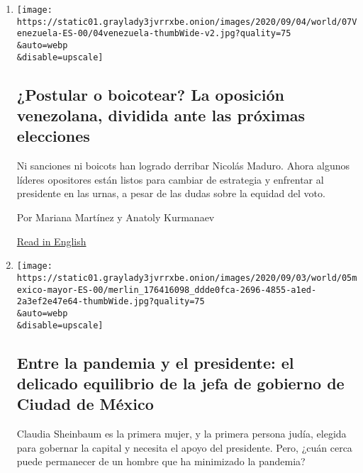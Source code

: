 \begin{enumerate}
\def\labelenumi{\arabic{enumi}.}
\item
  \href{/es/2020/09/07/espanol/america-latina/venezuela-oposicion.html}{}

  \texttt{[image: https://static01.graylady3jvrrxbe.onion/images/2020/09/04/world/07Venezuela-ES-00/04venezuela-thumbWide-v2.jpg?quality=75\\\&auto=webp\\\&disable=upscale]}

  \hypertarget{postular-o-boicotear-la-oposiciuxf3n-venezolana-dividida-ante-las-pruxf3ximas-elecciones}{%
  \subsection{¿Postular o boicotear? La oposición venezolana, dividida
  ante las próximas
  elecciones}\label{postular-o-boicotear-la-oposiciuxf3n-venezolana-dividida-ante-las-pruxf3ximas-elecciones}}

  Ni sanciones ni boicots han logrado derribar Nicolás Maduro. Ahora
  algunos líderes opositores están listos para cambiar de estrategia y
  enfrentar al presidente en las urnas, a pesar de las dudas sobre la
  equidad del voto.

  Por Mariana Martínez y Anatoly Kurmanaev

  \href{https://www.nytimes3xbfgragh.onion/2020/09/06/international-home/venezuela-elections-maduro.html}{Read
  in English}
\item
  \href{/es/2020/09/05/espanol/america-latina/coronavirus-amlo-sheinbaum.html}{}

  \texttt{[image: https://static01.graylady3jvrrxbe.onion/images/2020/09/03/world/05mexico-mayor-ES-00/merlin\_176416098\_ddde0fca-2696-4855-a1ed-2a3ef2e47e64-thumbWide.jpg?quality=75\\\&auto=webp\\\&disable=upscale]}

  \hypertarget{entre-la-pandemia-y-el-presidente-el-delicado-equilibrio-de-la-jefa-de-gobierno-de-ciudad-de-muxe9xico}{%
  \subsection{Entre la pandemia y el presidente: el delicado equilibrio
  de la jefa de gobierno de Ciudad de
  México}\label{entre-la-pandemia-y-el-presidente-el-delicado-equilibrio-de-la-jefa-de-gobierno-de-ciudad-de-muxe9xico}}

  Claudia Sheinbaum es la primera mujer, y la primera persona judía,
  elegida para gobernar la capital y necesita el apoyo del presidente.
  Pero, ¿cuán cerca puede permanecer de un hombre que ha minimizado la
  pandemia?


\end{enumerate}
